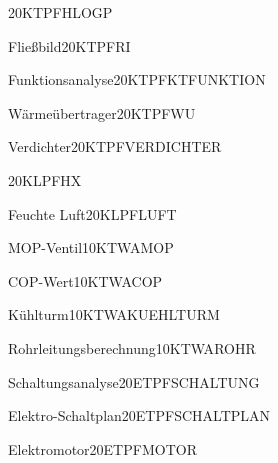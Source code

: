 \documentclass[bsz-mkk-exam,ka]{teacher}
\begin{document}

\begin{examaufgabe}{\hlogpdia}{20}{KT}{PF}{HLOGP}
\end{examaufgabe}

\begin{examaufgabe}{Fließbild}{20}{KT}{PF}{RI}
\end{examaufgabe}

\begin{examaufgabe}{Funktionsanalyse}{20}{KT}{PF}{KTFUNKTION}
\end{examaufgabe}

\begin{examaufgabe}{Wärmeübertrager}{20}{KT}{PF}{WU}
\end{examaufgabe}

\begin{examaufgabe}{Verdichter}{20}{KT}{PF}{VERDICHTER}
\end{examaufgabe}

\begin{examaufgabe}{\hxdia}{20}{KL}{PF}{HX}
\end{examaufgabe}

\begin{examaufgabe}{Feuchte Luft}{20}{KL}{PF}{LUFT}
\end{examaufgabe}

\begin{examaufgabe}{MOP-Ventil}{10}{KT}{WA}{MOP}
\end{examaufgabe}

\begin{examaufgabe}{COP-Wert}{10}{KT}{WA}{COP}
\end{examaufgabe}

\begin{examaufgabe}{Kühlturm}{10}{KT}{WA}{KUEHLTURM}
\end{examaufgabe}

\begin{examaufgabe}{Rohrleitungsberechnung}{10}{KT}{WA}{ROHR}
\end{examaufgabe}

\begin{examaufgabe}{Schaltungsanalyse}{20}{ET}{PF}{SCHALTUNG}
\end{examaufgabe}

\begin{examaufgabe}{Elektro-Schaltplan}{20}{ET}{PF}{SCHALTPLAN}
\end{examaufgabe}

\begin{examaufgabe}{Elektromotor}{20}{ET}{PF}{MOTOR}
\end{examaufgabe}
\end{document}
